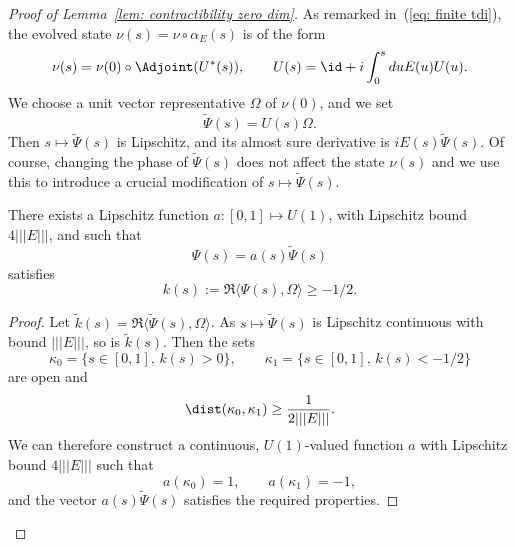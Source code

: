 \begin{proof}[Proof of Lemma~\ref{lem: contractibility zero dim}]
	As remarked in~(\ref{eq: finite tdi}), the evolved state $\nu(s)=\nu\circ \alpha_E(s)$ is of the form
	$$
	\nu(s) = \nu(0)\circ \Adjoint( U^*(s)), \qquad  U(s)=\id+i\int_0^s du E(u)U(u).
	$$
	We choose a unit vector representative $\Omega$ of $\nu(0)$, and we set 
	$$
	\widetilde\Psi(s)= U(s) \Omega.
	$$
	Then $s\mapsto\widetilde\Psi(s)$ is Lipschitz, and its almost sure derivative is $i E(s)\widetilde\Psi(s)$. 
	Of course, changing the phase of $\widetilde\Psi(s)$ does not affect the state $\nu(s)$ and we use this to introduce a crucial modification of $s\mapsto \widetilde\Psi(s)$.
	\begin{lemma}
		There exists a Lipschitz function $a: [0,1]\mapsto U(1)$, with Lipschitz bound $ 4|||E||| $, and such that 
		$$
		\Psi(s)= a(s) \widetilde\Psi(s)
		$$ 
		satisfies
		$$
		k(s) := \Re \langle \Psi(s) , \Omega \rangle \geq -1/2.
		$$
	\end{lemma}
	\begin{proof}
		Let $\widetilde k(s)=\Re \langle \widetilde \Psi(s) , \Omega \rangle$. As $s\mapsto \widetilde \Psi(s)$ is Lipschitz continuous with bound $|||E|||$, so is $\widetilde k(s)$. Then the sets
		$$
		\kappa_0=\{ s\in [0,1], \, k(s)> 0   \}, \qquad 
		\kappa_1=\{ s\in [0,1], \,  k(s)< -1/2   \}
		$$
		are open and
		$$
		\dist(\kappa_0,\kappa_1) \geq \frac{1}{2 |||E|||}.
		$$
		We can therefore construct a continuous, $U(1)$-valued function $a$ with Lipschitz bound $4 |||E|||$  such that 
		$$
		a(\kappa_0)=1, \qquad   a(\kappa_1) =-1,
		$$
		and the vector $a(s)\widetilde\Psi(s)$ satisfies the required properties.
	\end{proof}
	

\end{proof}
